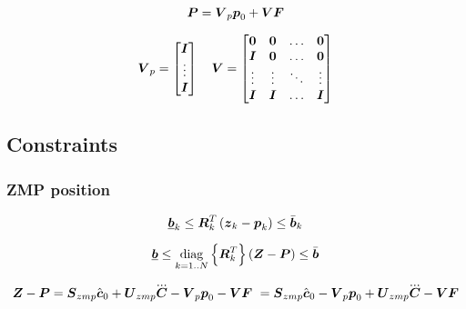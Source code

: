 \begin{equation*}
    \mbox{\boldmath $P$} = \mbox{\boldmath $V$}_p \mbox{\boldmath $p$}_0 + \mbox{\boldmath $V$} \mbox{\boldmath $F$}
\end{equation*}

\begin{equation*}
    \mbox{\boldmath $V$}_p = 
    \begin{bmatrix}
        \mbox{\boldmath $I$}\\
        \vdots\\
        \mbox{\boldmath $I$}\\
    \end{bmatrix}
    \quad
    \mbox{\boldmath $V$} = 
    \begin{bmatrix}
        \mbox{\boldmath $0$}   &   \mbox{\boldmath $0$}   & \dots     & \mbox{\boldmath $0$} \\
        \mbox{\boldmath $I$}   &   \mbox{\boldmath $0$}   & \dots     & \mbox{\boldmath $0$} \\
        \vdots  &   \vdots  & \ddots    & \vdots \\
        \mbox{\boldmath $I$}   &   \mbox{\boldmath $I$}   & \dots     & \mbox{\boldmath $I$} \\
    \end{bmatrix}
\end{equation*}



\subsection{Constraints}

\subsubsection{ZMP position}
\begin{equation*}
    \underline{\mbox{\boldmath $b$}}_k \le \mbox{\boldmath $R$}_k^T \left( \mbox{\boldmath $z$}_k - \mbox{\boldmath $p$}_k \right) \le \bar{\mbox{\boldmath $b$}}_k\\
\end{equation*}

\begin{equation*}
    \underline{\mbox{\boldmath $b$}} 
    \le 
    \underset{k = 1..N}{\operatorname{diag}}\left\{\mbox{\boldmath $R$}_k^T\right\}
    \left(
        \mbox{\boldmath $Z$}
        -
        \mbox{\boldmath $P$}
    \right) 
    \le
    \bar{\mbox{\boldmath $b$}}
\end{equation*}


\begin{equation*}
    \ZMP - \FP 
    =
    \M{S}_{zmp} \cstate_0  +  \M{U}_{zmp} \cJerk - \M{V}_p \fp_0 - \M{V} \FD\
    =
    \M{S}_{zmp} \cstate_0 - \M{V}_p \fp_0
    +
    \M{U}_{zmp} \cJerk - \M{V} \FD
\end{equation*}

